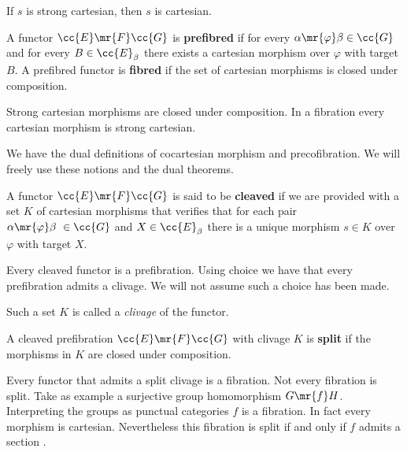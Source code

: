 \begin{observation}
If $s$ is strong cartesian, then $s$ is cartesian. 
\end{observation}

\begin{definition} %
A functor $\cc{E} \mr{F} \cc{G}$ is \textbf{prefibred} if for every ${\alpha \mr{\varphi} \beta \in \cc{G}}$ and for every ${B \in \cc{E}_\beta}$ there exists a cartesian morphism over $\varphi$ with target $B$. A prefibred functor is \textbf{fibred} if the set of cartesian morphisms is closed under composition.
\end{definition}


\begin{remark}\label{cartesianas cerradas por composicion implican fibracion}
Strong cartesian morphisms are closed under composition. In a fibration every cartesian morphism is strong cartesian.
\end{remark}


\begin{observation}
 We have the dual definitions of cocartesian morphism and precofibration. We will freely use these notions and the dual theorems.
\end{observation}

\begin{definition}
A functor $\cc{E} \mr{F} \cc{G}$ is said to be \textbf{cleaved} if we are provided with a set $K$ of cartesian morphisms that verifies that for  each pair ${\alpha \mr{\varphi} \beta\ \in \cc{G}}$ and $X \in \cc{E}_\beta$ there is a unique morphism $s \in K$ over $\varphi$ with target $X$.
\end{definition}

\begin{observation}
Every cleaved functor is a prefibration. Using choice we have that every prefibration admits a clivage. We will not assume such a choice has been made.  
\end{observation}
 
\noindent Such a set $K$ is called a \textit{clivage} of the functor.

 

\begin{definition}
A cleaved prefibration $\cc{E} \mr{F} \cc{G}$ with clivage $K$ is \textbf{split} if the morphisms in  $K$ are closed under composition.
\end{definition}


\begin{observation}
Every functor that admits a split clivage is a fibration. Not every fibration is split. Take as example a surjective group homomorphism $G \mr{f} H$. Interpreting the groups as punctual categories $f$ is a fibration. In fact every morphism is cartesian. Nevertheless this fibration is split if and only if $f$ admits a section \cite{sga1}.
\end{observation}


